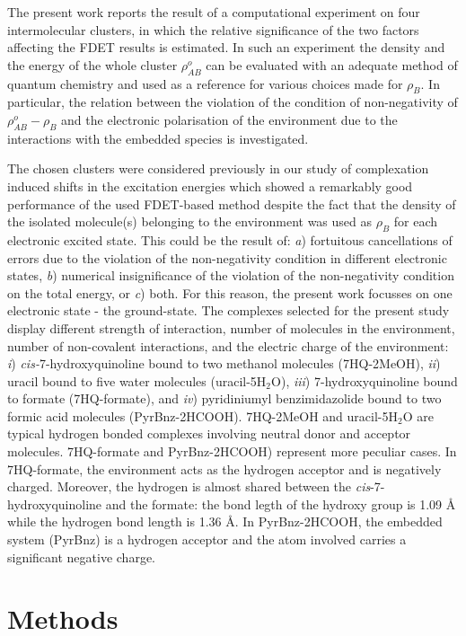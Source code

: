 \documentclass[amsmath,amssymb,preprint,aip,jcp]{revtex4-1}
\begin{document}
The present work reports the result of a computational experiment on four intermolecular clusters, in which the relative significance 
of the two factors affecting the FDET results is estimated. In such an experiment the density and the energy of the whole cluster $\rho_{AB}^o$ can be evaluated with an adequate method of quantum chemistry and used as a reference for various choices made for $\rho_B$.
In particular, the relation between the violation of the condition of non-negativity of $\rho_{AB}^o-\rho_B$ and the electronic polarisation of the environment due to the interactions with the embedded species is investigated.

The chosen clusters were considered previously in our study of complexation induced shifts in the excitation energies \cite{Ricardi2018} which showed a remarkably good performance of the used FDET-based method despite the fact that the density of the isolated molecule(s) belonging to the environment was used as $\rho_B$ for each electronic excited state. This could be the result of: {\it a}) fortuitous cancellations of errors due to the violation of the non-negativity condition in different electronic states, {\it b}) numerical insignificance of the violation of the non-negativity condition on the total energy, or {\it c}) both. 
For this reason, the present work focusses on one electronic state - the ground-state.
The complexes selected for the present study display different strength of interaction, number of molecules in the environment, number of non-covalent interactions, and the electric charge of the environment:
{\it i}) \textit{cis-}7-hydroxyquinoline bound to two methanol molecules (7HQ-2MeOH), {\it ii}) uracil bound to five water molecules (uracil-5H$_2$O), {\it iii}) 7-hydroxyquinoline bound to formate (7HQ-formate), and {\it iv}) pyridiniumyl benzimidazolide bound to two formic acid molecules (PyrBnz-2HCOOH). 
7HQ-2MeOH and uracil-5H$_2$O are typical hydrogen bonded complexes involving neutral donor and acceptor molecules. 7HQ-formate and PyrBnz-2HCOOH) represent more peculiar cases. In 7HQ-formate, the environment acts as the hydrogen acceptor and is negatively charged. Moreover, the hydrogen is almost shared between the \textit{cis}-7-hydroxyquinoline and the formate: the bond legth of the hydroxy group is 1.09 {\AA} while the hydrogen bond length is 1.36 {\AA}. 
In PyrBnz-2HCOOH, the embedded system (PyrBnz) is a hydrogen acceptor and the atom involved carries a significant negative charge.
\section{Methods}
\end{document}
